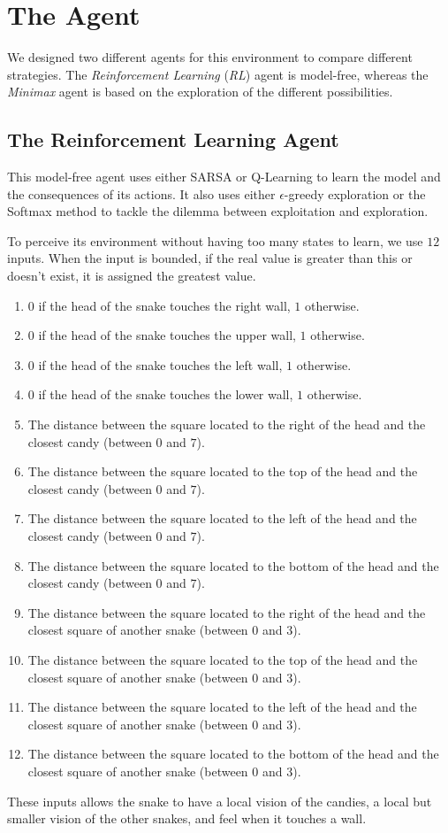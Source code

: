 \documentclass[journal, a4paper]{IEEEtran}
\begin{document}
\section{The Agent}

We designed two different agents for this environment to compare different strategies.
The \emph{Reinforcement Learning} (\emph{RL}) agent is model-free, whereas the \emph{Minimax} agent is based on the exploration of the different possibilities.

\subsection{The Reinforcement Learning Agent}

This model-free agent uses either SARSA or Q-Learning to learn the model and the consequences of its actions.
It also uses either $\epsilon$-greedy exploration or the Softmax method to tackle the dilemma between exploitation and exploration.

To perceive its environment without having too many states to learn, we use $12$ inputs.
When the input is bounded, if the real value is greater than this or doesn't exist, it is assigned the greatest value.
\begin{enumerate}
    \item $0$ if the head of the snake touches the right wall, $1$ otherwise.
    \item $0$ if the head of the snake touches the upper wall, $1$ otherwise.
    \item $0$ if the head of the snake touches the left wall, $1$ otherwise.
    \item $0$ if the head of the snake touches the lower wall, $1$ otherwise.
    \item The distance between the square located to the right of the head and the closest candy (between $0$ and $7$).
    \item The distance between the square located to the top of the head and the closest candy (between $0$ and $7$).
    \item The distance between the square located to the left of the head and the closest candy (between $0$ and $7$).
    \item The distance between the square located to the bottom of the head and the closest candy (between $0$ and $7$).
    \item The distance between the square located to the right of the head and the closest square of another snake (between $0$ and $3$).
    \item The distance between the square located to the top of the head and the closest square of another snake (between $0$ and $3$).
    \item The distance between the square located to the left of the head and the closest square of another snake (between $0$ and $3$).
    \item The distance between the square located to the bottom of the head and the closest square of another snake (between $0$ and $3$).
\end{enumerate}
These inputs allows the snake to have a local vision of the candies, a local but smaller vision of the other snakes, and feel when it touches a wall.
\end{document}
